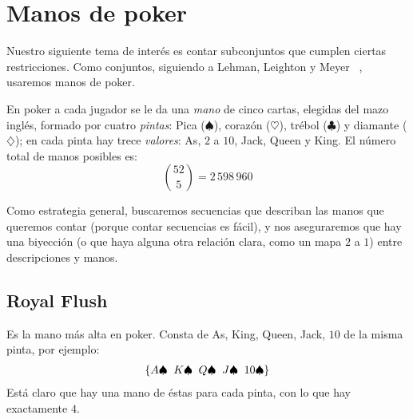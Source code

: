 %

\section{Manos de poker}
\label{sec:manos-poker}


  Nuestro siguiente tema de interés es contar subconjuntos
  que cumplen ciertas restricciones.
  Como conjuntos,
  siguiendo a Lehman, Leighton y Meyer~%
    \cite{lehman15:_mathem_comput_scien},
  usaremos manos de \foreignlanguage{english}{poker}.

  En \foreignlanguage{english}{poker}
  a cada jugador se le da una \emph{mano} de cinco cartas,
  elegidas del mazo inglés,
  formado por cuatro \emph{pintas}:%
  Pica (\(\spadesuit\)),
  corazón (\(\heartsuit\)),
  trébol (\(\clubsuit\))
  y diamante (\(\diamondsuit\));
  en cada pinta hay trece \emph{valores}:%
  As, \(2\) a \(10\),
  \foreignlanguage{english}{Jack},
  \foreignlanguage{english}{Queen}
  y \foreignlanguage{english}{King}.
  El número total de manos posibles es:
  \begin{equation*}
    \binom{52}{5} = 2\,598\,960
  \end{equation*}

  Como estrategia general,
  buscaremos secuencias que describan las manos que queremos contar
  (porque contar secuencias es fácil),
  y nos aseguraremos que hay una biyección
  (o que haya alguna otra relación clara,
   como un mapa \(2\) a \(1\))
  entre descripciones
  y manos.

\subsection{Royal Flush}
\label{sec:royal-flush}

  Es la mano más alta en \foreignlanguage{english}{poker}.
  Consta de \foreignlanguage{english}{As},
  \foreignlanguage{english}{King},
  \foreignlanguage{english}{Queen},
  \foreignlanguage{english}{Jack}, \(10\) de la misma pinta,
  por ejemplo:
  \begin{equation*}
    \begin{array}{@{\{}*{4}{c@{\;\;}}c@{\}}}
      A \spadesuit & K \spadesuit & Q \spadesuit &
	J \spadesuit & 10 \spadesuit
    \end{array}
  \end{equation*}
  Está claro que hay una mano de éstas para cada pinta,
  con lo que hay exactamente \(4\).

